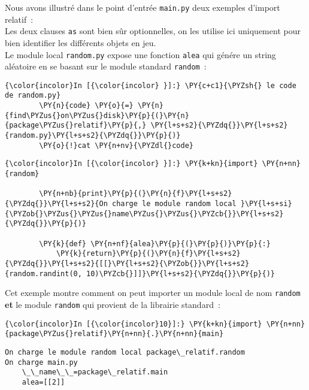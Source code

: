     Nous avons illustré dans le point d'entrée \texttt{main.py} deux
exemples d'import relatif~:\\

    Les deux clauses \texttt{as} sont bien sûr optionnelles, on les utilise
ici uniquement pour bien identifier les différents objets en jeu.\\

    Le module local \texttt{random.py} expose une fonction \texttt{alea} qui
génére un string aléatoire en se basant sur le module standard
\texttt{random}~:

    \begin{Verbatim}[commandchars=\\\{\}]
{\color{incolor}In [{\color{incolor} }]:} \PY{c+c1}{\PYZsh{} le code de random.py}
        \PY{n}{code} \PY{o}{=} \PY{n}{find\PYZus{}on\PYZus{}disk}\PY{p}{(}\PY{n}{package\PYZus{}relatif}\PY{p}{,} \PY{l+s+s2}{\PYZdq{}}\PY{l+s+s2}{random.py}\PY{l+s+s2}{\PYZdq{}}\PY{p}{)}
        \PY{o}{!}cat \PY{n+nv}{\PYZdl{}code}
\end{Verbatim}


    \begin{Verbatim}[commandchars=\\\{\}]
{\color{incolor}In [{\color{incolor} }]:} \PY{k+kn}{import} \PY{n+nn}{random}
        
        \PY{n+nb}{print}\PY{p}{(}\PY{n}{f}\PY{l+s+s2}{\PYZdq{}}\PY{l+s+s2}{On charge le module random local }\PY{l+s+si}{\PYZob{}\PYZus{}\PYZus{}name\PYZus{}\PYZus{}\PYZcb{}}\PY{l+s+s2}{\PYZdq{}}\PY{p}{)}
        
        \PY{k}{def} \PY{n+nf}{alea}\PY{p}{(}\PY{p}{)}\PY{p}{:}
            \PY{k}{return}\PY{p}{(}\PY{n}{f}\PY{l+s+s2}{\PYZdq{}}\PY{l+s+s2}{[[}\PY{l+s+s2}{\PYZob{}}\PY{l+s+s2}{random.randint(0, 10)\PYZcb{}]]}\PY{l+s+s2}{\PYZdq{}}\PY{p}{)}
\end{Verbatim}


    Cet exemple montre comment on peut importer un module local de nom
\texttt{random} \textbf{et} le module \texttt{random} qui provient de la
librairie standard~:

    \begin{Verbatim}[commandchars=\\\{\}]
{\color{incolor}In [{\color{incolor}10}]:} \PY{k+kn}{import} \PY{n+nn}{package\PYZus{}relatif}\PY{n+nn}{.}\PY{n+nn}{main}
\end{Verbatim}


    \begin{Verbatim}[commandchars=\\\{\}]
On charge le module random local package\_relatif.random
On charge main.py
    \_\_name\_\_=package\_relatif.main
    alea=[[2]]

    \end{Verbatim}

